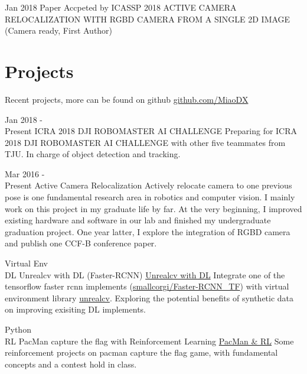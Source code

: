\documentclass[utf8]{twentysecondcv} %
\begin{document}
\begin{twenty}
    \twentyitem
        {Jan 2018}
        {Paper Accpeted by ICASSP 2018}
        {}
        {}
        {ACTIVE CAMERA RELOCALIZATION WITH RGBD CAMERA
FROM A SINGLE 2D IMAGE (Camera ready, First Author)}
\end{twenty}

\section{Projects}
\begin{twenty}

    \twentyitem
        {}
        {Recent projects, more can be found on github}
        {\href{https://github.com/MiaoDX/}{github.com/MiaoDX}}
        {}
        {}
          
    \twentyitem
    {Jan 2018 - \\ Present}
    {ICRA 2018 DJI ROBOMASTER AI CHALLENGE}
    {}
    {}
    {Preparing for ICRA 2018 DJI ROBOMASTER AI CHALLENGE with other five teammates from TJU. In charge of object detection and tracking.}        
    
    \twentyitem
    {Mar 2016 - \\ Present}
    {Active Camera Relocalization}
    {}
    {}
    {Actively relocate camera to one previous pose is one fundamental research area in robotics and computer vision. I mainly work on this project in my graduate life by far. At the very beginning, I improved existing hardware and software in our lab and finished my undergraduate graduation project. One year latter, I explore the integration of RGBD camera and publish one CCF-B conference paper.}
    
          
    \twentyitem
        {Virtual Env \\ DL}
        {Unrealcv with DL (Faster-RCNN)}
        {\href{https://github.com/MiaoDX/unrealcv_examples/}{Unrealcv with DL}}
        {}
        {Integrate one of the tensorflow faster rcnn implements (\href{https://github.com/smallcorgi/Faster-RCNN\_TF}{smallcorgi/Faster-RCNN\_TF}) with virtual environment library \href{https://github.com/unrealcv/unrealcv}{unrealcv}. Exploring the potential benefits of synthetic data on improving exisiting DL implements.}          




                 
    \twentyitem
        {Python \\ RL}
        {PacMan capture the flag with Reinforcement Learning}
        {\href{https://github.com/MiaoDX/hand_in_homework/tree/master/Advanced\_AI/}{PacMan \& RL}}
        {}
        {Some reinforcement projects on pacman capture the flag game, with fundamental concepts and a contest hold in class.}
        

\end{twenty}
\end{document}
